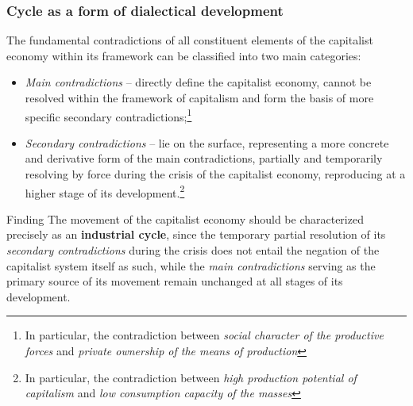 \begin{frame}
  \frametitle{Cycle as a form of dialectical development}
  The fundamental contradictions of all constituent elements of the capitalist economy within its framework can be classified into two main categories:
  \begin{itemize}
    \item \textit{Main contradictions} – directly define the capitalist economy, cannot be resolved within the framework of capitalism and form the basis of more specific secondary contradictions;\footnote{In particular, the contradiction between \textit{social character of the productive forces} and \textit{private ownership of the means of production}}
    \item \textit{Secondary contradictions} – lie on the surface, representing a more concrete and derivative form of the main contradictions, partially and temporarily resolving by force during the crisis of the capitalist economy, reproducing at a higher stage of its development.\footnote{In particular, the contradiction between \textit{high production potential of capitalism} and \textit{low consumption capacity of the masses}}
  \end{itemize}

  \begin{alertblock}{Finding}
    The movement of the capitalist economy should be characterized precisely as an \textbf{industrial cycle}, since the temporary partial resolution of its \textit{secondary contradictions} during the crisis does not entail the negation of the capitalist system itself as such, while the \textit{main contradictions} serving as the primary source of its movement remain unchanged at all stages of its development.
  \end{alertblock}
\end{frame}